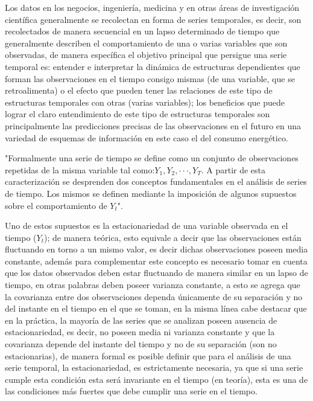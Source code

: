 \documentclass[12pt,letterpaper]{report}
\begin{document}
Los datos en los negocios, ingeniería, medicina y en otras áreas de investigación científica generalmente se recolectan en forma de series temporales, es decir, son recolectados de manera secuencial en un lapso determinado de tiempo que generalmente describen el comportamiento de una o varias variables que son observadas, de manera específica el objetivo principal que persigue una serie temporal es: entender e interpretar la dinámica de estructuras dependientes que forman las observaciones en el tiempo consigo mismas (de una variable, que se retroalimenta) o el efecto que pueden tener las relaciones de este tipo de estructuras temporales con otras (varias variables); los beneficios que puede lograr el claro entendimiento de este tipo de estructuras temporales son principalmente las predicciones precisas de las observaciones en el futuro en una variedad de esquemas de información en este caso el del consumo energético.

"Formalmente una serie de tiempo se define como un conjunto de observaciones repetidas de la misma variable tal como:$ Y_1, Y_2, · · · , Y_T$. A partir de esta caracterización se desprenden dos conceptos fundamentales en el análisis de series de tiempo. Los mismos se definen mediante la imposición de algunos supuestos
sobre el comportamiento de $Y_t$". \cite{Isaac}

Uno de estos supuestos es la estacionariedad de una variable observada en el tiempo ($Y_t$); de manera teórica, esto equivale a decir que las observaciones están fluctuando en torno a un mismo valor, es decir dichas observaciones poseen media constante, además para complementar este concepto es necesario tomar en cuenta que los datos observados deben estar fluctuando de manera similar en un lapso de tiempo, en otras palabras deben poseer varianza constante, a esto se agrega que la covarianza entre dos observaciones dependa únicamente de su separación y no del instante en el tiempo en el que se toman, en la misma línea cabe destacar que en la práctica, la mayoría de las series que se analizan poseen ausencia de estacionariedad, es decir, no poseen media ni varianza constante y que la covarianza depende del instante del tiempo y no de su separación  (son no estacionarias), de manera formal es posible definir que para el análisis de una serie temporal, la estacionariedad, es estrictamente necesaria, ya que si una serie cumple esta condición esta será invariante en el tiempo (en teoría), esta es una de las condiciones más fuertes que debe cumplir una serie en el tiempo.
\end{document}

